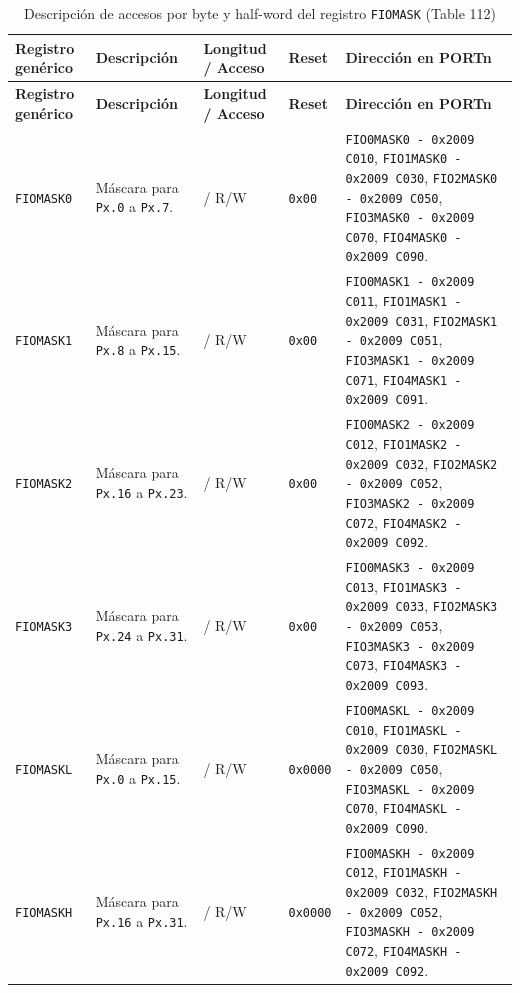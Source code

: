 \begin{longtable}{|>{\raggedright\arraybackslash}p{}|>{\raggedright\arraybackslash}p{}|>{\centering\arraybackslash}p{}|>{\centering\arraybackslash}p{}|>{\raggedright\arraybackslash}p{}|}
\caption{Descripción de accesos por byte y half-word del registro \texttt{FIOMASK} (Table 112)} \\
\hline
\textbf{Registro genérico} & \textbf{Descripción} & \textbf{Longitud / Acceso} & \textbf{Reset} & \textbf{Dirección en PORTn} \\
\hline
\endfirsthead
\hline
\textbf{Registro genérico} & \textbf{Descripción} & \textbf{Longitud / Acceso} & \textbf{Reset} & \textbf{Dirección en PORTn} \\
\hline
\endhead
\texttt{FIOMASK0} & Máscara para \texttt{Px.0} a \texttt{Px.7}. & 8 / R/W & \texttt{0x00} & \texttt{FIO0MASK0 - 0x2009 C010}, \texttt{FIO1MASK0 - 0x2009 C030}, \texttt{FIO2MASK0 - 0x2009 C050}, \texttt{FIO3MASK0 - 0x2009 C070}, \texttt{FIO4MASK0 - 0x2009 C090}. \\
\hline
\texttt{FIOMASK1} & Máscara para \texttt{Px.8} a \texttt{Px.15}. & 8 / R/W & \texttt{0x00} & \texttt{FIO0MASK1 - 0x2009 C011}, \texttt{FIO1MASK1 - 0x2009 C031}, \texttt{FIO2MASK1 - 0x2009 C051}, \texttt{FIO3MASK1 - 0x2009 C071}, \texttt{FIO4MASK1 - 0x2009 C091}. \\
\hline
\texttt{FIOMASK2} & Máscara para \texttt{Px.16} a \texttt{Px.23}. & 8 / R/W & \texttt{0x00} & \texttt{FIO0MASK2 - 0x2009 C012}, \texttt{FIO1MASK2 - 0x2009 C032}, \texttt{FIO2MASK2 - 0x2009 C052}, \texttt{FIO3MASK2 - 0x2009 C072}, \texttt{FIO4MASK2 - 0x2009 C092}. \\
\hline
\texttt{FIOMASK3} & Máscara para \texttt{Px.24} a \texttt{Px.31}. & 8 / R/W & \texttt{0x00} & \texttt{FIO0MASK3 - 0x2009 C013}, \texttt{FIO1MASK3 - 0x2009 C033}, \texttt{FIO2MASK3 - 0x2009 C053}, \texttt{FIO3MASK3 - 0x2009 C073}, \texttt{FIO4MASK3 - 0x2009 C093}. \\
\hline
\texttt{FIOMASKL} & Máscara para \texttt{Px.0} a \texttt{Px.15}. & 16 / R/W & \texttt{0x0000} & \texttt{FIO0MASKL - 0x2009 C010}, \texttt{FIO1MASKL - 0x2009 C030}, \texttt{FIO2MASKL - 0x2009 C050}, \texttt{FIO3MASKL - 0x2009 C070}, \texttt{FIO4MASKL - 0x2009 C090}. \\
\hline
\texttt{FIOMASKH} & Máscara para \texttt{Px.16} a \texttt{Px.31}. & 16 / R/W & \texttt{0x0000} & \texttt{FIO0MASKH - 0x2009 C012}, \texttt{FIO1MASKH - 0x2009 C032}, \texttt{FIO2MASKH - 0x2009 C052}, \texttt{FIO3MASKH - 0x2009 C072}, \texttt{FIO4MASKH - 0x2009 C092}. \\
\hline
\end{longtable}


